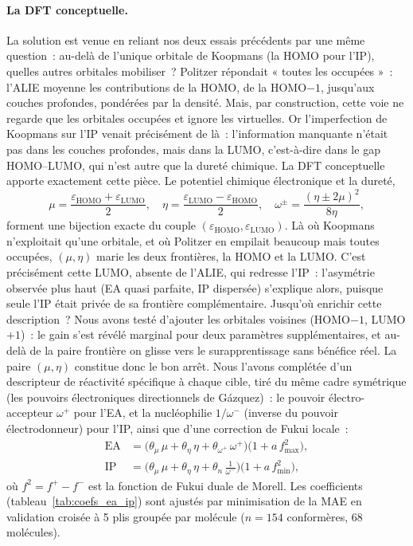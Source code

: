 \paragraph{La DFT conceptuelle.}
La solution est venue en reliant nos deux essais précédents par une même question~: au-delà de l'unique orbitale de Koopmans (la HOMO pour l'IP), quelles autres orbitales mobiliser~? Politzer répondait « toutes les occupées »~: l'ALIE moyenne les contributions de la HOMO, de la HOMO$-1$, jusqu'aux couches profondes, pondérées par la densité. Mais, par construction, cette voie ne regarde que les orbitales occupées et ignore les virtuelles. Or l'imperfection de Koopmans sur l'IP venait précisément de là~: l'information manquante n'était pas dans les couches profondes, mais dans la LUMO, c'est-à-dire dans le gap HOMO--LUMO, qui n'est autre que la dureté chimique. La DFT conceptuelle\cite{geerlings2003} apporte exactement cette pièce. Le potentiel chimique électronique\cite{parr1978} et la dureté\cite{parr1983},
\begin{equation}
\mu = \frac{\varepsilon_{\text{HOMO}} + \varepsilon_{\text{LUMO}}}{2}, \quad
\eta = \frac{\varepsilon_{\text{LUMO}} - \varepsilon_{\text{HOMO}}}{2}, \quad
\omega^{\pm} = \frac{(\eta \pm 2\mu)^2}{8\eta},
\label{eq:cdft_descriptors}
\end{equation}
forment une bijection exacte du couple $(\varepsilon_{\text{HOMO}}, \varepsilon_{\text{LUMO}})$. Là où Koopmans n'exploitait qu'une orbitale, et où Politzer en empilait beaucoup mais toutes occupées, $(\mu, \eta)$ marie les deux frontières, la HOMO et la LUMO. C'est précisément cette LUMO, absente de l'ALIE, qui redresse l'IP~: l'asymétrie observée plus haut (EA quasi parfaite, IP dispersée) s'explique alors, puisque seule l'IP était privée de sa frontière complémentaire. Jusqu'où enrichir cette description~? Nous avons testé d'ajouter les orbitales voisines (HOMO$-1$, LUMO$+1$)~: le gain s'est révélé marginal pour deux paramètres supplémentaires, et au-delà de la paire frontière on glisse vers le surapprentissage sans bénéfice réel. La paire $(\mu, \eta)$ constitue donc le bon arrêt. Nous l'avons complétée d'un descripteur de réactivité spécifique à chaque cible, tiré du même cadre symétrique (les pouvoirs électroniques directionnels de Gázquez\cite{gazquez2007})~: le pouvoir électro-accepteur $\omega^+$ pour l'EA, et la nucléophilie $1/\omega^-$ (inverse du pouvoir électrodonneur) pour l'IP\cite{hoffmann2024}, ainsi que d'une correction de Fukui\cite{parr1984} locale~:
\begin{align}
\text{EA} &= \big(\theta_\mu\,\mu + \theta_\eta\,\eta + \theta_{\omega^+}\,\omega^+\big)\big(1 + a\,f^2_{\max}\big), \label{eq:model_ea}\\
\text{IP} &= \big(\theta_\mu\,\mu + \theta_\eta\,\eta + \theta_n\,\tfrac{1}{\omega^-}\big)\big(1 + a\,f^2_{\min}\big), \label{eq:model_ip}
\end{align}
où $f^2 = f^+ - f^-$ est la fonction de Fukui duale de Morell\cite{morell2005}. Les coefficients (tableau~\ref{tab:coefs_ea_ip}) sont ajustés par minimisation de la MAE en validation croisée à 5 plis groupée par molécule ($n = 154$ conformères, 68 molécules).

